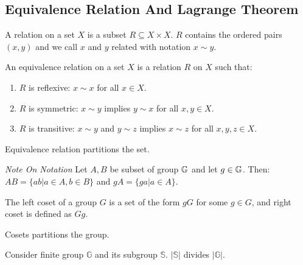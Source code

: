 \documentclass[../note.tex]{subfiles}
\begin{document}
\subsection{Equivalence Relation And Lagrange Theorem}

\begin{definition}[Relation]\label{def:relation}
	A relation on a set $X$ is a subset $R \subseteq X\times X$. $R$ contains the ordered pairs $(x,y)$ and we call $x$ and $y$ related with notation $x \sim y$.
\end{definition}

\begin{definition} 
An equivalence relation on a set $X$ is a relation $R$ on $X$ such that:
\begin{enumerate}
\item $R$ is reflexive: $x \sim x$ for all $x \in X$.
\item $R$ is symmetric: $x \sim y$ implies $y \sim x$ for all $x,y \in X$.
\item $R$ is transitive: $x \sim y$ and $y \sim z$ implies $x \sim z$ for all $x,y,z \in X$.
\end{enumerate}
\end{definition}

\begin{theorem}
	Equivalence relation partitions the set.
\end{theorem}

\emph{Note On Notation}
Let $A, B$ be subset of group $\mathbb{G}$ and let $g \in \mathbb{G}$. Then:
$AB = \{ab|a\in A, b\in B\}$ and $gA = \{ga|a\in A\}$. 

\begin{definition}[Coset]
	The left coset of a group $G$ is a set of the form $gG$ for some $g\in G$, and right coset is defined as $Gg$.
\end{definition}

\begin{theorem}
Cosets partitions the group. 
\end{theorem}

\begin{theorem}
Consider finite group $\mathbb{G}$ and its subgroup $\mathbb{S}$. $|\mathbb{S}|$ divides $|\mathbb{G}|.$	
\end{theorem}
\end{document}
